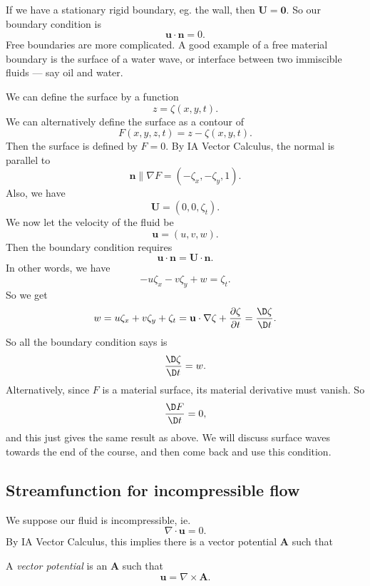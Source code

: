 \documentclass[a4paper]{article}
\begin{document}
If we have a stationary rigid boundary, eg. the wall, then $\mathbf{U} = \mathbf{0}$. So our boundary condition is
\[
  \mathbf{u}\cdot \mathbf{n}= 0.
\]
Free boundaries are more complicated. A good example of a free material boundary is the surface of a water wave, or interface between two immiscible fluids --- say oil and water.
\begin{center}
\end{center}
We can define the surface by a function
\[
  z = \zeta(x, y, t).
\]
We can alternatively define the surface as a contour of
\[
  F(x, y, z, t) = z - \zeta(x, y, t).
\]
Then the surface is defined by $F = 0$. By IA Vector Calculus, the normal is parallel to
\[
  \mathbf{n} \parallel \nabla F = (-\zeta_x, -\zeta_y, 1).
\]
Also, we have
\[
  \mathbf{U} = (0, 0, \zeta_t).
\]
We now let the velocity of the fluid be
\[
  \mathbf{u} = (u, v, w).
\]
Then the boundary condition requires
\[
  \mathbf{u}\cdot \mathbf{n} = \mathbf{U}\cdot \mathbf{n}.
\]
In other words, we have
\[
  -u \zeta_x - v\zeta_y + w = \zeta_t.
\]
So we get
\[
  w = u \zeta_x + v\zeta_y + \zeta_t = \mathbf{u}\cdot \nabla \zeta + \frac{\partial \zeta}{\partial t} = \frac{\D \zeta}{\D t}.
\]
So all the boundary condition says is
\[
  \frac{\D \zeta}{\D t} = w.
\]
Alternatively, since $F$ is a material surface, its material derivative must vanish. So
\[
  \frac{\D F}{\D t} = 0,
\]
and this just gives the same result as above. We will discuss surface waves towards the end of the course, and then come back and use this condition.

\subsection{Streamfunction for incompressible flow}
We suppose our fluid is incompressible, ie.
\[
  \nabla \cdot \mathbf{u} = 0.
\]
By IA Vector Calculus, this implies there is a vector potential $\mathbf{A}$ such that
\begin{defi}
  A \emph{vector potential} is an $\mathbf{A}$ such that
  \[
    \mathbf{u} = \nabla \times \mathbf{A}.
  \]
\end{defi}
\end{document}
